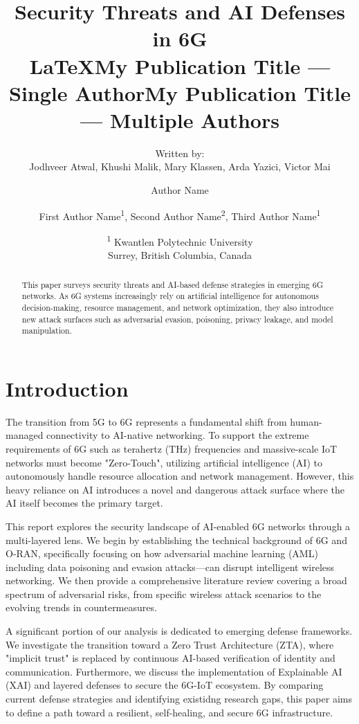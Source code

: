 \documentclass[letterpaper]{article} %
\title{Security Threats and AI Defenses in 6G\\\LaTeX{}}
\author{
    Written by: \\
    Jodhveer Atwal,
    Khushi Malik,
    Mary Klassen,
    Arda Yazici,
    Victor Mai
}
\date{
    \textsuperscript{\rm 1}
}
\title{My Publication Title --- Single Author}
\author {
    Author Name
}
\date{
    Kwantlen Polytechnic University\\
    Surrey, British Columbia, Canada\\
}
\title{My Publication Title --- Multiple Authors}
\author {
    First Author Name\textsuperscript{\rm 1},
    Second Author Name\textsuperscript{\rm 2},
    Third Author Name\textsuperscript{\rm 1}
}
\begin{document}
\maketitle

\begin{abstract}
This paper surveys security threats and AI-based defense strategies in emerging 6G networks. As 6G systems increasingly rely on artificial intelligence for autonomous decision-making, resource management, and network optimization, they also introduce new attack surfaces such as adversarial evasion, poisoning, privacy leakage, and model manipulation.
\end{abstract}

\section{Introduction}

The transition from 5G to 6G represents a fundamental shift from human-managed connectivity to AI-native networking. To support the extreme requirements of 6G such as terahertz (THz) frequencies and massive-scale IoT networks must become "Zero-Touch", utilizing artificial intelligence (AI) to autonomously handle resource allocation and network management. However, this heavy reliance on AI introduces a novel and dangerous attack surface where the AI itself becomes the primary target.

This report explores the security landscape of AI-enabled 6G networks through a multi-layered lens. We begin by establishing the technical background of 6G and O-RAN, specifically focusing on how adversarial machine learning (AML) including data poisoning and evasion attacks---can disrupt intelligent wireless networking. We then provide a comprehensive literature review covering a broad spectrum of adversarial risks, from specific wireless attack scenarios to the evolving trends in countermeasures.

A significant portion of our analysis is dedicated to emerging defense frameworks. We investigate the transition toward a Zero Trust Architecture (ZTA), where "implicit trust" is replaced by continuous AI-based verification of identity and communication. Furthermore, we discuss the implementation of Explainable AI (XAI) and layered defenses to secure the 6G-IoT ecosystem. By comparing current defense strategies and identifying existidng research gaps, this paper aims to define a path toward a resilient, self-healing, and secure 6G infrastructure.
\end{document}
